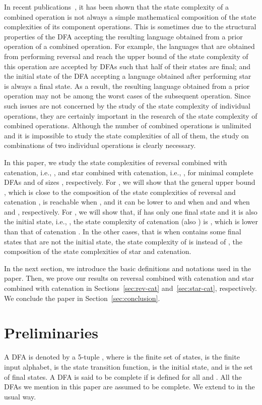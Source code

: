 \documentclass[10pt]{article}
\begin{document}
In recent
publications~\cite{CGKY10-cat-sr,CGKY10-cat-ui,EGLY2009,GaSaYu08,GaYu09,GaYu10,JiOk07,LiMaSaYu08,SaSaYu07},
it has been shown that the state complexity of a combined operation
is not always a simple mathematical composition of the state
complexities of its component operations.
This is sometimes due to the structural properties of the DFA accepting the resulting language obtained from a prior operation of a combined operation.
For example, the languages that are obtained from performing reversal and reach the upper bound of the state complexity of this operation are accepted by DFAs such that half of their states are final; and the initial state of the DFA accepting a language obtained after performing star is always a final state.
As a result, the resulting language obtained from a prior operation may not be among the worst cases of the subsequent operation.
Since such issues are not concerned by the study of the state complexity of individual operations, they are certainly important in the research of the state complexity of combined operations.
Although the number of combined operations is unlimited and it is impossible to study the state complexities of all of them, the study on combinations of two individual operations is clearly necessary.

In this paper, we study the state complexities of reversal combined with catenation, i.e., , and star combined with catenation, i.e., , for minimal complete DFAs  and  of sizes , respectively.
For , we will show that the general upper bound , which is close to the composition of the state complexities of reversal and catenation , is reachable when , and it can be lower to  and  when  and  and when  and , respectively.
For , we will show that, if  has only one final state and it is also the initial state, i.e., , the state complexity of catenation (also ) is , which is lower than that of catenation .
In the other cases, that is when  contains some final states that are not the initial state, the state complexity of  is  instead of , the composition of the state complexities of star and catenation.

In the next section, we introduce the basic definitions and notations used in the paper.
Then, we prove our results on reversal combined with catenation and star combined with catenation in Sections~\ref{sec:rev-cat} and~\ref{sec:star-cat}, respectively.
We conclude the paper in Section~\ref{sec:conclusion}.

\section{Preliminaries}
A DFA is denoted by a 5-tuple , where  is the finite set of states,  is the finite input alphabet,  is the state transition function,  is the initial state, and  is the set of final states.
A DFA is said to be complete if  is defined for all  and .
All the DFAs we mention in this paper are assumed to be complete.
We extend  to  in the usual way.
\end{document}
